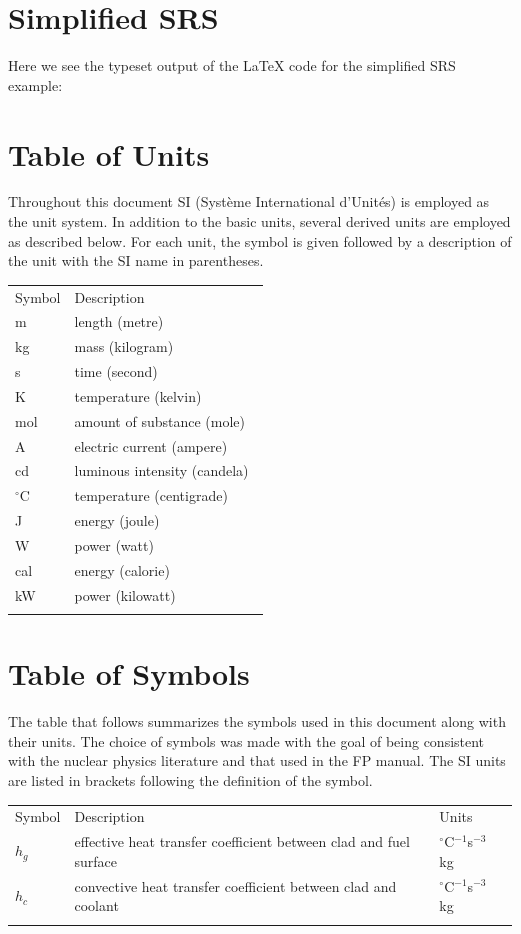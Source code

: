 \documentclass[preprint, 10pt]{sigplanconf}
\begin{document}
\clearpage
\onecolumn
\appendix
\section{Simplified SRS}
\label{appendix:SRS}
Here we see the typeset output of the LaTeX code for the simplified SRS example:

\section*{Table of Units}
\label{Sec:ToU}
Throughout this document SI (Syst\`{e}me International
d'Unit\'{e}s) is employed as the unit system. In addition to
the basic units, several derived units are employed as
described below. For each unit, the symbol is given followed
by a description of the unit with the SI name in
parentheses.
\begin{longtable}{l p{8.5cm}}
Symbol & Description\
\\
m & length (metre)\
\\
kg & mass (kilogram)\
\\
s & time (second)\
\\
K & temperature (kelvin)\
\\
mol & amount of substance (mole)\
\\
A & electric current (ampere)\
\\
cd & luminous intensity (candela)\
\\
${}^{\circ}$C & temperature (centigrade)\
\\
J & energy (joule)\
\\
W & power (watt)\
\\
cal & energy (calorie)\
\\
kW & power (kilowatt)\
\\
\label{Table:ToU}
\end{longtable}
\section*{Table of Symbols}
\label{Sec:ToS}
The table that follows summarizes the symbols used in this document along with
their units. The choice of symbols was made with the goal of being consistent
with the nuclear physics literature and that used in the FP manual. The SI units
are listed in brackets following the definition of the symbol.
\begin{longtable}{l l p{8.5cm}}
Symbol & Description & Units\
\\
$h_{g}$ & effective heat transfer coefficient between clad
and fuel surface & ${}^{\circ}$C$^{-1}$s$^{-3}$kg\
\\
$h_{c}$ & convective heat transfer coefficient between clad
and coolant & ${}^{\circ}$C$^{-1}$s$^{-3}$kg\
\\
\label{Table:ToS}
\end{longtable}
\end{document}
